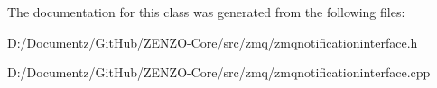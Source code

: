 The documentation for this class was generated from the following files\+:\begin{DoxyCompactItemize}
\item 
D\+:/\+Documentz/\+Git\+Hub/\+Z\+E\+N\+Z\+O-\/\+Core/src/zmq/zmqnotificationinterface.\+h\item 
D\+:/\+Documentz/\+Git\+Hub/\+Z\+E\+N\+Z\+O-\/\+Core/src/zmq/zmqnotificationinterface.\+cpp\end{DoxyCompactItemize}
